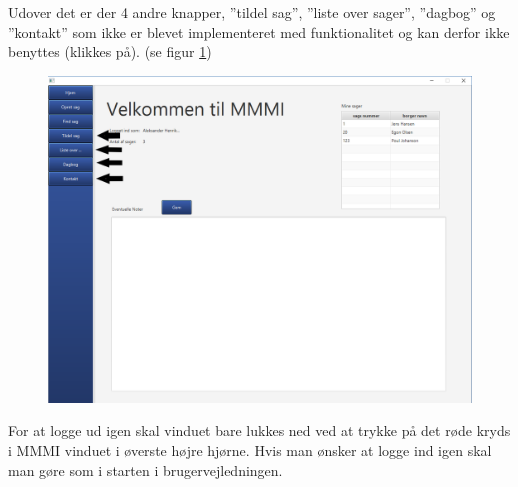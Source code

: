 \newpage
Udover det er der 4 andre knapper, ”tildel sag”, ”liste over sager”, ”dagbog” og ”kontakt” som ikke er blevet implementeret med funktionalitet og kan derfor ikke benyttes (klikkes på). (se figur \ref{bru:f11})\\
\begin{figure}[htb!]
  \includegraphics[scale = 0.3]{./PNG/brugervejledning/figur11.PNG} 
  \caption{}  
  \label{bru:f11}
\end{figure}
For at logge ud igen skal vinduet bare lukkes ned ved at trykke på det røde kryds i MMMI vinduet i øverste højre hjørne. Hvis man ønsker at logge ind igen skal man gøre som i starten i brugervejledningen.\\
\newpage